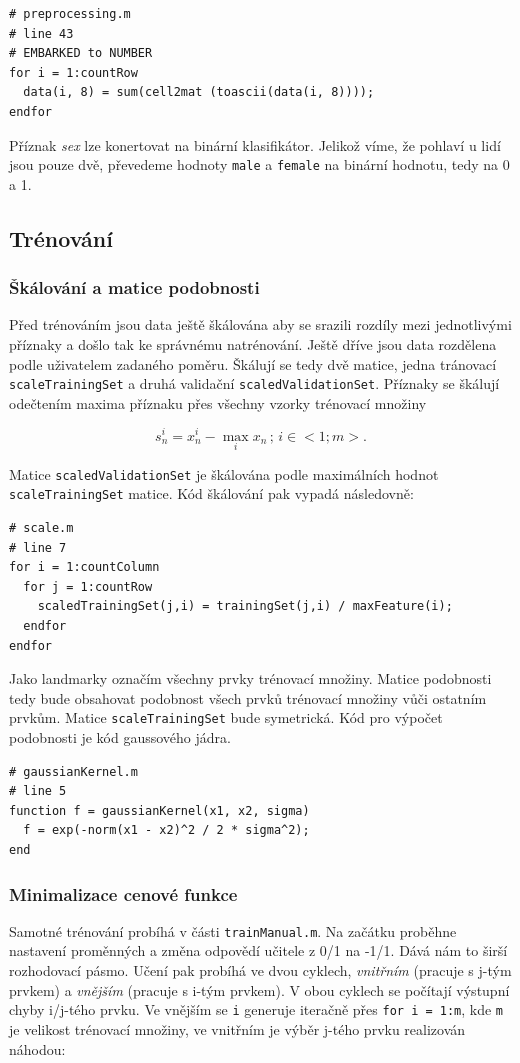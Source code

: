 \documentclass[a4]{article}
\begin{document}
\begin{lstlisting}
# preprocessing.m
# line 43 
# EMBARKED to NUMBER
for i = 1:countRow
  data(i, 8) = sum(cell2mat (toascii(data(i, 8))));
endfor
\end{lstlisting}

\noindent Příznak \textit{sex} lze konertovat na binární klasifikátor. Jelikož víme, že pohlaví u lidí jsou pouze dvě, převedeme hodnoty \texttt{male} a \texttt{female} na binární hodnotu, tedy na 0 a 1.

\subsection{Trénování}
\subsubsection{Škálování a matice podobnosti}
Před trénováním jsou data ještě škálována aby se srazili rozdíly mezi jednotlivými příznaky a došlo tak ke správnému natrénování. Ještě dříve jsou data rozdělena podle uživatelem zadaného poměru. Škálují se tedy dvě matice, jedna tránovací \texttt{scaleTrainingSet} a druhá validační \texttt{scaledValidationSet}. Příznaky se škálují odečtením maxima příznaku přes všechny vzorky trénovací množiny

$$
s_{n}^{i} = x_{n}^{i} - \max_{i} x_{n} \,;\, i \in <1;m>.
$$

\noindent Matice \texttt{scaledValidationSet} je škálována podle maximálních hodnot\\\texttt{scaleTrainingSet} matice. Kód škálování pak vypadá následovně:

\begin{lstlisting}
# scale.m
# line 7 
for i = 1:countColumn
  for j = 1:countRow
    scaledTrainingSet(j,i) = trainingSet(j,i) / maxFeature(i);
  endfor
endfor 
\end{lstlisting}

\noindent Jako landmarky označím všechny prvky trénovací množiny. Matice podobnosti tedy bude obsahovat podobnost všech prvků trénovací množiny vůči ostatním prvkům. Matice \texttt{scaleTrainingSet} bude symetrická. Kód pro výpočet podobnosti je kód gaussového jádra.

\begin{lstlisting}
# gaussianKernel.m
# line 5
function f = gaussianKernel(x1, x2, sigma)
  f = exp(-norm(x1 - x2)^2 / 2 * sigma^2); 
end
\end{lstlisting}

\subsubsection{Minimalizace cenové funkce}
Samotné trénování probíhá v části \texttt{trainManual.m}. Na začátku proběhne nastavení proměnných a změna odpovědí učitele z 0/1 na -1/1. Dává nám to širší rozhodovací pásmo. Učení pak probíhá ve dvou cyklech, \textit{vnitřním} (pracuje s j-tým prvkem) a \textit{vnějším} (pracuje s i-tým prvkem). V obou cyklech se počítají výstupní chyby i/j-tého prvku. Ve vnějším se \texttt{i} generuje iteračně přes \texttt{for i = 1:m}, kde \texttt{m} je velikost trénovací množiny, ve vnitřním je výběr j-tého prvku realizován náhodou:
\end{document}
